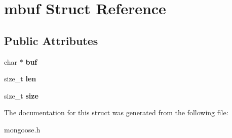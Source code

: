 \hypertarget{structmbuf}{}\section{mbuf Struct Reference}
\label{structmbuf}
\subsection*{Public Attributes}
\begin{DoxyCompactItemize}
\item 
\mbox{\label{structmbuf_ae2a6e23a4997e9aea0908628db2b23d0}} 
char $\ast$ {\bfseries buf}
\item 
\mbox{\label{structmbuf_a4da00860609dd46fe8b679d5e1deeac3}} 
size\+\_\+t {\bfseries len}
\item 
\mbox{\label{structmbuf_ae245d03a50c2891c1fb228093d842270}} 
size\+\_\+t {\bfseries size}
\end{DoxyCompactItemize}


The documentation for this struct was generated from the following file\+:\begin{DoxyCompactItemize}
\item 
mongoose.\+h\end{DoxyCompactItemize}
